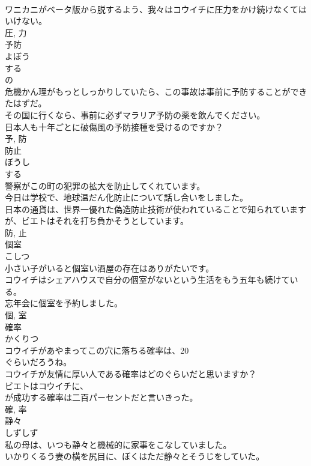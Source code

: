 \documentclass[8pt]{extreport}
\begin{document}
\begin{CJK}{UTF8}{min}
\\	ワニカニがベータ版から脱するよう、我々はコウイチに圧力をかけ続けなくてはいけない。	
\\	圧, 力	
\\	予防	
\\	よぼう	
\\	する 
\\	の 
\\	危機かん理がもっとしっかりしていたら、この事故は事前に予防することができたはずだ。	
\\	その国に行くなら、事前に必ずマラリア予防の薬を飲んでください。	
\\	日本人も十年ごとに破傷風の予防接種を受けるのですか？	
\\	予, 防	
\\	防止	
\\	ぼうし	
\\	する 
\\	警察がこの町の犯罪の拡大を防止してくれています。	
\\	今日は学校で、地球温だん化防止について話し合いをしました。	
\\	日本の通貨は、世界一優れた偽造防止技術が使われていることで知られていますが、ビエトはそれを打ち負かそうとしています。	
\\	防, 止	
\\	個室	
\\	こしつ	
\\	小さい子がいると個室い酒屋の存在はありがたいです。	
\\	コウイチはシェアハウスで自分の個室がないという生活をもう五年も続けている。	
\\	忘年会に個室を予約しました。	
\\	個, 室	
\\	確率	
\\	かくりつ	
\\	コウイチがあやまってこの穴に落ちる確率は、20
\\	ぐらいだろうね。	
\\	コウイチが友情に厚い人である確率はどのぐらいだと思いますか？	
\\	ビエトはコウイチに、
\\	が成功する確率は二百パーセントだと言いきった。	
\\	確, 率	
\\	静々	
\\	しずしず	
\\	私の母は、いつも静々と機械的に家事をこなしていました。	
\\	いかりくるう妻の横を尻目に、ぼくはただ静々とそうじをしていた。	

\end{CJK}
\end{document}
